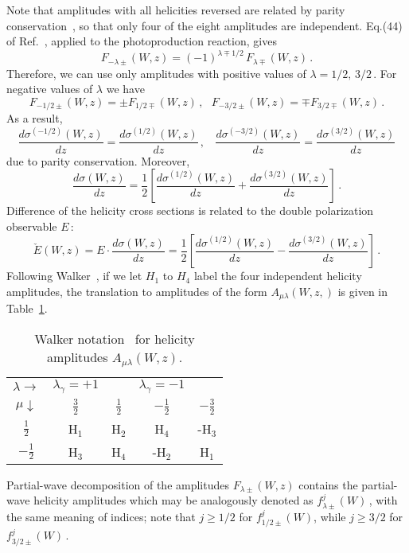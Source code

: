 \documentclass[prc,reprint,onecolumn,amsmath,amssymb,superscriptaddress]{revtex4-1}
\newcommand{\be}{\begin{equation}}
\newcommand{\ee}{\end{equation}}
\begin{document}
Note that amplitudes with all helicities reversed are related by parity
conservation~\cite{jw}, so that only four of the eight amplitudes are 
independent.  Eq.(44) of Ref.~\cite{jw}, applied to the photoproduction reaction, 
gives
\be
	F_{-\lambda\pm}(W,z)=(-1)^{\lambda\mp1/2}\,F_{\lambda\mp}(W,z)\,.
	\label{par}
\ee
Therefore, we can use only amplitudes with positive values of $\lambda=
1/2,\,3/2\,$.  For negative values of $\lambda$ we have
$$
	F_{-1/2\pm}(W,z)=\pm F_{1/2\mp}(W,z)\,,~~~
	F_{-3/2\pm}(W,z)=\mp F_{3/2\mp}(W,z)\,.
$$
As a result,
$$
	\frac{d\sigma^{(-1/2)}(W,z)}{d z}=\frac{d\sigma^{(1/2)}(W,z)}{d z}\,,~~~~
	\frac{d\sigma^{(-3/2)}(W,z)}{d z}=\frac{d\sigma^{(3/2)}(W,z)}{d z}
$$
due to parity conservation. Moreover,
\be
	\frac{d\sigma(W,z)}{d z}=\frac12\left[\frac{d\sigma^{(1/2)}(W,z)}{d z}
	+\frac{d\sigma^{(3/2)}(W,z)}{d z}\right]\,.
	\label{sig-obs}
\ee
Difference of the helicity cross sections is related to the double polarization
observable $E\,$:
\be
	\check{E}(W,z)=E\cdot\frac{d\sigma(W,z)}{d z}=
	\frac12\left[\frac{d\sigma^{(1/2)}(W,z)}{d z}
	-\frac{d\sigma^{(3/2)}(W,z)}{d z}\right]\,.
	\label{e-obs}
\ee
Following Walker~\cite{Walker}, if we let $H_1$ to $H_4$ label the
four independent helicity amplitudes,   
the translation to amplitudes of the form
$A_{\mu\lambda}(W,z,)$ is given in Table~\ref{tab:tab1}.
\begin{table}[htb!]
\begin{center}
\caption{\label{tab:tab1} Walker notation~\cite{Walker} for 
helicity amplitudes $A_{\mu\lambda}(W,z)$.}
\begin{tabular}{|c|cc|cc|}
\hline
$\lambda\rightarrow$  & $\lambda_{\gamma}=+1$  &               & $\lambda_{\gamma}=-1$ & \\
$\mu\downarrow$       & $\frac{3}{2}$   & $\frac{1}{2}$ & $-\frac{1}{2}$ & $-\frac{3}{2}$ \\
\hline
 $\frac{1}{2}$& H$_1$    & H$_2$    & H$_4$     &-H$_3$ \\
$-\frac{1}{2}$& H$_3$    & H$_4$    &-H$_2$     & H$_1$ \\
\hline
\end{tabular}
\end{center}
\end{table}

Partial-wave decomposition of the amplitudes $F_{\lambda\pm}(W,z)$ contains 
the partial-wave helicity amplitudes which may be analogously denoted as 
$f^j_{\lambda\pm}(W)\,$, with the same meaning of indices; note that $j\geq1/2$ 
for $f^j_{1/2\pm}(W)$, while $j\geq3/2$ for $f^j_{3/2\pm}(W)\,$.
\end{document}
